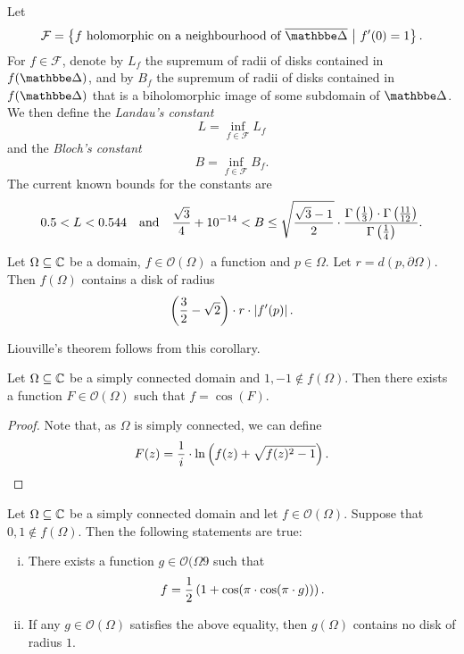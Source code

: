 \begin{opomba}
Let
\[
\mathcal{F} =
\setb{\text{$f$ holomorphic on a neighbourhood of $\oline{\dsk}$}}
{f'(0) = 1}.
\]
For $f \in \mathcal{F}$, denote by $L_f$ the supremum of radii of
disks contained in $f(\dsk)$, and by $B_f$ the supremum of radii of
disks contained in $f(\dsk)$ that is a biholomorphic image of some
subdomain of $\dsk$. We then define the \emph{Landau's constant}
\[
L = \inf_{f \in \mathcal{F}} L_f
\]
and the \emph{Bloch's constant}
\[
B = \inf_{f \in \mathcal{F}} B_f.
\]
The current known bounds for the constants are
\[
0.5 < L < 0.544
\quad \text{and} \quad
\frac{\sqrt{3}}{4} + 10^{-14} < B \leq
\sqrt{\frac{\sqrt{3} - 1}{2}} \cdot
\frac{\Gamma \left(\frac{1}{3}\right) \cdot \Gamma \left(\frac{11}{12}\right)}
{\Gamma \left(\frac{1}{4}\right)}.
\]
\end{opomba}

\begin{posledica}
\label{thm_hol:cor:bloch}
Let $\Omega \subseteq \mathbb{C}$ be a domain, $f \in \mathcal{O}(\Omega)$
a function and $p \in \Omega$. Let $r = d(p, \partial \Omega)$.
Then $f(\Omega)$ contains a disk of radius
\[
\left(\frac{3}{2} - \sqrt{2}\right) \cdot r \cdot \left\lvert f'(p)\right\rvert.
\]
\end{posledica}

\obvs

\begin{opomba}
Liouville's theorem follows from this corollary.
\end{opomba}

\begin{lema}
Let $\Omega \subseteq \mathbb{C}$ be a simply connected domain and
$1, -1 \not \in f(\Omega)$. Then there exists a function
$F \in \mathcal{O}(\Omega)$ such that $f = \cos(F)$.
\end{lema}

\begin{proof}
Note that, as $\Omega$ is simply connected, we can define
\[
F(z) =
\frac{1}{i} \cdot \ln \left(f(z) + \sqrt{f(z)^2-1}\right). \qedhere
\]
\end{proof}

\begin{izrek}
Let $\Omega \subseteq \mathbb{C}$ be a simply connected domain and let
$f \in \mathcal{O}(\Omega)$. Suppose that
$0, 1 \not \in f(\Omega)$. Then the following statements are true:

\begin{enumerate}[i)]
\item There exists a function $g \in \mathcal{O}(\Omega9$ such that
\[
f = \frac{1}{2} \left(1 + \cos(\pi \cdot \cos(\pi \cdot g))\right).
\]
\item If any $g \in \mathcal{O}(\Omega)$ satisfies the above
equality, then $g(\Omega)$ contains no disk of radius $1$.
\end{enumerate}
\end{izrek}

